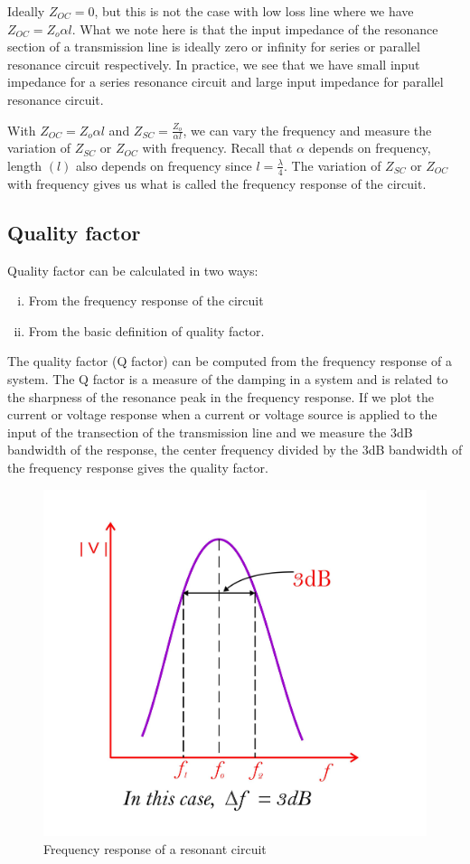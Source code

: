 Ideally $ Z_{OC}=0 $, but this is not the case with low loss line where we have $ Z_{OC} = Z_{o} \alpha l $. What we note here is that the input impedance of the resonance section of a transmission line is ideally zero or infinity for series or parallel resonance circuit respectively. In practice, we see that we have small input impedance for a series resonance circuit and large input impedance for parallel resonance circuit.

With $ Z_{OC} = Z_{o} \alpha l $ and 
$ Z_{SC}= \frac{Z_{o}}{\alpha l} $, we can vary the frequency and measure the variation of $ Z_{SC} $ or $ Z_{OC} $ with frequency. Recall that $ \alpha $ depends on frequency, length $(l)$ also depends on frequency since $ l=\frac{\lambda}{4} $. The variation of $ Z_{SC} $ or $ Z_{OC} $ with frequency gives us what is called the frequency response of the circuit.

\subsection{Quality factor}
Quality factor can be calculated in two ways:
\begin{enumerate}[(i)]
\item From the frequency response of the circuit
\item From the basic definition of quality factor.
\end{enumerate}
The quality factor (Q factor) can be computed from the frequency response of a system. The Q factor is a measure of the damping in a system and is related to the sharpness of the resonance peak in the frequency response. If we plot the current or voltage response when a current or voltage source is applied to the input of the transection of the transmission line and we measure the 3dB bandwidth of the response, the center frequency divided by the 3dB bandwidth of the frequency response gives the quality factor.
\begin{figure}[h]
\centering
\includegraphics[width=0.8\linewidth]{./graphics/fig2}
\caption{Frequency response of a resonant circuit}
\label{fig:fig2}
\end{figure}


